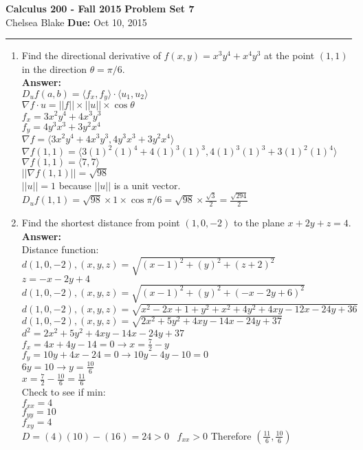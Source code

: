 \documentclass[11pt]{article}
\newcommand{\hwheadings}[3]{
{\bf Calculus 200 -  Fall 2015} \hfill {{\bf Problem Set #1}}\\
{{\bf } #2} \hfill {{\bf Due:} #3} \\
\rule[0.1in]{\textwidth}{0.025in}
}
\begin{document}
\hwheadings{7}{Chelsea Blake}{Oct 10, 2015}


\begin{enumerate}


    
    
    
    \item Find the directional derivative of $f(x,y) = x^3y^4+x^4y^3$ at the point $(1,1)$ in the direction $\theta =\pi/6$.
    \\
    \textbf{Answer:}
    \\
    $D_uf(a,b)= \langle f_x, f_y \rangle \cdot \langle u_1,u_2 \rangle$
    \\
    $\nabla f \cdot u= ||f|| \times ||u|| \times \cos \theta$
    \\
    $f_x=3x^2y^4+4x^3y^3$
    \\
    $f_y=4y^3x^3+3y^2x^4$
    \\
    $\nabla f= \langle 3x^2y^4+4x^3y^3, 4y^3x^3+3y^2x^4 \rangle$
    \\
    $\nabla f(1,1)= \langle 3(1)^2(1)^4+4(1)^3(1)^3, 4(1)^3(1)^3+3(1)^2(1)^4 \rangle$
    \\
     $\nabla f(1,1)= \langle 7,7 \rangle$
     \\
     $||\nabla f(1,1)||=\sqrt{98}$
     \\
     $||u||=1$ because $||u||$ is a unit vector.
     \\
     $D_uf(1,1)= \sqrt{98} \times 1 \times \cos{\pi/6}= \sqrt{98} \times \frac{\sqrt{3}}{2}= \frac{\sqrt{294}}{2} $
    
   
   \item  Find the shortest distance from point $(1,0,-2)$ to the plane $x+2y+z=4$.
   \\
   \textbf{Answer:}
   \\
   Distance function: $d(1,0,-2),(x,y,z)=\sqrt{(x-1)^2+(y)^2+(z+2)^2}$
   \\
   $z=-x-2y+4$
   \\
   $d(1,0,-2),(x,y,z)=\sqrt{(x-1)^2+(y)^2+(-x-2y+6)^2}$
   \\
   $d(1,0,-2),(x,y,z)=\sqrt{x^2-2x+1+y^2+x^2+4y^2+4xy-12x-24y+36}$
   \\
   $d(1,0,-2),(x,y,z)=\sqrt{2x^2+5y^2+4xy-14x-24y+37}$
   \\
   $d^2=2x^2+5y^2+4xy-14x-24y+37$
   \\
   $f_x=4x+4y-14=0 \rightarrow x=\frac{7}{2}-y$
   \\
   $f_y=10y+4x-24=0 \rightarrow 10y-4y-10=0$
   \\
  $6y=10 \rightarrow y=\frac{10}{6}$
  \\
  $x=\frac{7}{2}-\frac{10}{6}= \frac{11}{6}$
  \\
  Check to see if min:
  \\
  $f_{xx}= 4$
  \\
  $f_{yy}= 10$
  \\
  $f_{xy}= 4$
  \\
  $D=(4)(10)-(16)=24>0 \; \; \; f_{xx}>0$ Therefore $(\frac{11}{6}, \frac{10}{6})$
   

\end{enumerate}
\end{document}
